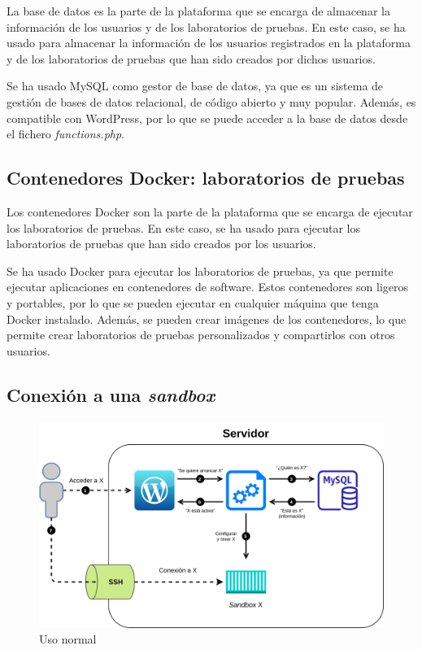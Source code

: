             La base de datos es la parte de la plataforma que se encarga de almacenar la información de los usuarios y de los laboratorios de pruebas. En este caso, se ha usado para almacenar la información de los usuarios registrados en la plataforma y de los laboratorios de pruebas que han sido creados por dichos usuarios.
            
            Se ha usado MySQL como gestor de base de datos, ya que es un sistema de gestión de bases de datos relacional, de código abierto y muy popular. Además, es compatible con WordPress, por lo que se puede acceder a la base de datos desde el fichero \textit{functions.php}.
        
        
        \subsection{Contenedores Docker: laboratorios de pruebas}

            Los contenedores Docker son la parte de la plataforma que se encarga de ejecutar los laboratorios de pruebas. En este caso, se ha usado para ejecutar los laboratorios de pruebas que han sido creados por los usuarios.
            
            Se ha usado Docker para ejecutar los laboratorios de pruebas, ya que permite ejecutar aplicaciones en contenedores de software. Estos contenedores son ligeros y portables, por lo que se pueden ejecutar en cualquier máquina que tenga Docker instalado. Además, se pueden crear imágenes de los contenedores, lo que permite crear laboratorios de pruebas personalizados y compartirlos con otros usuarios.
            
        
        \subsection{Conexión a una \textit{sandbox}}
        
        \begin{figure}[h]
            \centering
            \includegraphics[scale=0.20]{images/Diagramas/Arquitectura 1.png}
            \caption{Uso normal}
            \label{fig:conexion-sandbox}
        \end{figure}
        
